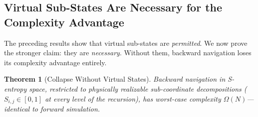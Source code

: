 \documentclass[12pt,twocolumn]{article}
\newtheorem{theorem}{Theorem}[section]
\begin{document}
\subsection{Virtual Sub-States Are Necessary for the Complexity Advantage}

The preceding results show that virtual sub-states are \emph{permitted}. We now prove the stronger claim: they are \emph{necessary}. Without them, backward navigation loses its complexity advantage entirely.

\begin{theorem}[Collapse Without Virtual States]
\label{thm:collapse}
Backward navigation in S-entropy space, restricted to physically realizable sub-coordinate decompositions ($S_{i,j} \in [0,1]$ at every level of the recursion), has worst-case complexity $\Omega(N)$---identical to forward simulation.
\end{theorem}
\end{document}
